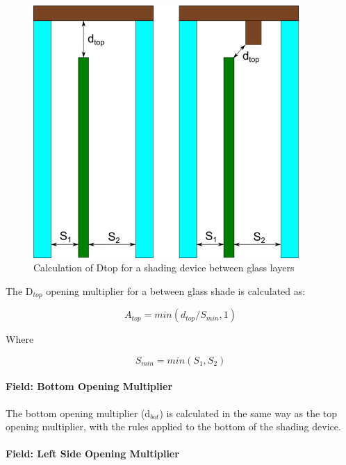 \begin{figure}[htbp]
\centering
\includegraphics[width=0.9\textwidth, height=0.9\textheight, keepaspectratio=true]{media/calculation-of-dtop-for-a-shading-device-collage.png}
\caption{Calculation of Dtop for a shading device between glass layers \protect \label{fig:calculation-of-dtop-for-a-shading-device-between-glass-layers}}
\end{figure}

The D\(_{top}\) opening multiplier for a between glass shade is calculated as:

\begin{equation*}
A_{top} = min(d_{top}/S_{min}, 1)
\end{equation*}

Where

\begin{equation*}
S_{min} = min(S_1, S_2)
\end{equation*}

\paragraph{Field: Bottom Opening Multiplier}\label{field-bottom-opening-multiplier-1}

The bottom opening multiplier (d\(_{bot}\)) is calculated in the same way as the top opening multiplier, with the rules applied to the bottom of the shading device.

\paragraph{Field: Left Side Opening Multiplier}\label{field-left-side-opening-multiplier-1}

